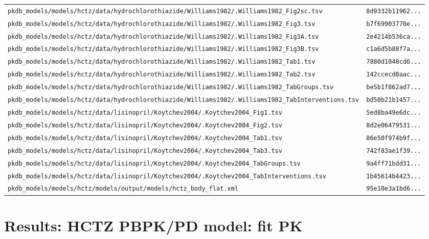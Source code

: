 \begin{longtable}{ll}
\texttt{pkdb\_models/models/hctz/data/hydrochlorothiazide/Williams1982/.Williams1982\_Fig2sc.tsv} & \texttt{8d9332b11962...} \\
\texttt{pkdb\_models/models/hctz/data/hydrochlorothiazide/Williams1982/.Williams1982\_Fig3.tsv} & \texttt{b7f69903770e...} \\
\texttt{pkdb\_models/models/hctz/data/hydrochlorothiazide/Williams1982/.Williams1982\_Fig3A.tsv} & \texttt{2e4214b536ca...} \\
\texttt{pkdb\_models/models/hctz/data/hydrochlorothiazide/Williams1982/.Williams1982\_Fig3B.tsv} & \texttt{c1a6d5b88f7a...} \\
\texttt{pkdb\_models/models/hctz/data/hydrochlorothiazide/Williams1982/.Williams1982\_Tab1.tsv} & \texttt{7880d1048cd6...} \\
\texttt{pkdb\_models/models/hctz/data/hydrochlorothiazide/Williams1982/.Williams1982\_Tab2.tsv} & \texttt{142ccecd0aac...} \\
\texttt{pkdb\_models/models/hctz/data/hydrochlorothiazide/Williams1982/.Williams1982\_TabGroups.tsv} & \texttt{be5b1f862ad7...} \\
\texttt{pkdb\_models/models/hctz/data/hydrochlorothiazide/Williams1982/.Williams1982\_TabInterventions.tsv} & \texttt{bd50b21b1457...} \\
\texttt{pkdb\_models/models/hctz/data/lisinopril/Koytchev2004/.Koytchev2004\_Fig1.tsv} & \texttt{5ed8ba49e6dc...} \\
\texttt{pkdb\_models/models/hctz/data/lisinopril/Koytchev2004/.Koytchev2004\_Fig2.tsv} & \texttt{8d2e06479531...} \\
\texttt{pkdb\_models/models/hctz/data/lisinopril/Koytchev2004/.Koytchev2004\_Tab1.tsv} & \texttt{86e50f974b9f...} \\
\texttt{pkdb\_models/models/hctz/data/lisinopril/Koytchev2004/.Koytchev2004\_Tab3.tsv} & \texttt{742f83ae1f39...} \\
\texttt{pkdb\_models/models/hctz/data/lisinopril/Koytchev2004/.Koytchev2004\_TabGroups.tsv} & \texttt{9a4ff71bdd31...} \\
\texttt{pkdb\_models/models/hctz/data/lisinopril/Koytchev2004/.Koytchev2004\_TabInterventions.tsv} & \texttt{1b45614b4423...} \\
\texttt{pkdb\_models/models/hctz/models/output/models/hctz\_body\_flat.xml} & \texttt{95e10e3a1bd6...} \\
\end{longtable}

\section{Results: HCTZ PBPK/PD model: fit PK}

